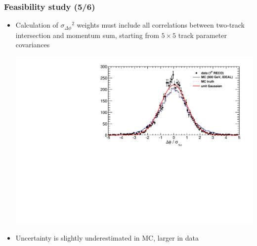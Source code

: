 \documentclass[compress]{beamer}
\begin{document}
\begin{frame}
\frametitle{Feasibility study (5/6)}
\begin{itemize}
\item Calculation of ${\sigma_{\Delta \phi}}^2$ weights must include
  all correlations between two-track intersection and momentum sum,
  starting from $5\times 5$ track parameter covariances

\includegraphics[width=\linewidth]{kaonTracking_normalized.pdf}

\item Uncertainty is slightly underestimated in MC, larger in data

\end{itemize}
\end{frame}
\end{document}
